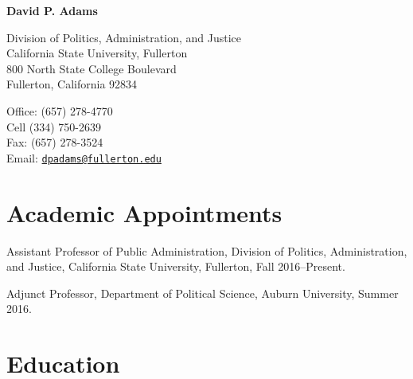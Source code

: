 \documentclass[11pt,letterpaper]{article}
\def\name{David P. Adams}
\renewenvironment{itemize}{
  \begin{list}{}{
    \setlength{\leftmargin}{1.5em}
    \setlength{\itemsep}{0.25em}
    \setlength{\parskip}{0pt}
    \setlength{\parsep}{0.25em}
  }
}{
  \end{list}
}
\begin{document}
	
	
\centerline{\huge \bf \name}
\smallskip

\bigskip

\begin{minipage}[t]{0.495\textwidth}
  Division of Politics, Administration, and Justice \\
  California State University, Fullerton \\
  800 North State College Boulevard  \\
  Fullerton, California 92834
\end{minipage}
\hspace{1.25in}
\begin{minipage}[t]{0.495\textwidth}
  Office: (657) 278-4770 \\
  Cell \hspace{.75em} (334) 750-2639 \\
  Fax: \hspace{1em}(657) 278-3524 \\
  Email: \href{mailto:dpadams@fullerton.edu}{\texttt{dpadams@fullerton.edu}}
\end{minipage}

\section*{Academic Appointments}

	\begin{itemize}\leftmargin=2pt\itemindent=-15pt
		\item Assistant Professor of Public Administration, Division of Politics, Administration, and Justice, California State University, Fullerton, Fall 2016--Present.
		\item Adjunct Professor, Department of Political Science, Auburn University, Summer 2016.
	\end{itemize}

\section*{Education}
\end{document}
